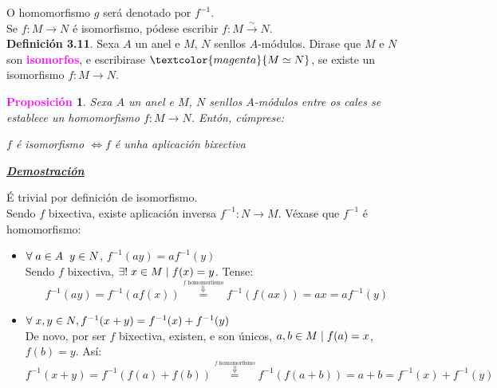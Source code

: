 \documentclass[twoside]{report}
\newcommand{\magbf}[1]{\textcolor{magenta}{\textbf{#1}}} %
\newcommand{\magen}[1]{\textcolor{magenta}{#1}}
\theoremstyle{mystyle}
\newtheorem{prop}{\magbf{Proposición}}[chapter]
\newenvironment{proposition}
{\begin{mdframed}[linecolor = magenta,backgroundcolor = classicrose, linewidth = 2mm]\begin{prop}}
{\end{prop}\end{mdframed}}
\begin{document}
\noindent O homomorfismo $g$ será denotado por $f^{-1}$.\\

\noindent Se $f: M \longrightarrow N$ é isomorfismo, pódese escribir $f: M \overset{\sim}{\longrightarrow} N$.\\

\noindent \textbf{Definición 3.11}. Sexa $A$ un anel e $M$, $N$ senllos $A$-módulos. Dirase que $M$ e $N$ son \magbf{isomorfos}, e escribirase $\magen{M \simeq N}$, se existe un isomorfismo $f: M \longrightarrow N$.\\

\begin{proposition} \label{prop3.9}
Sexa $A$ un anel e $M$, $N$ senllos $A$-módulos entre os cales se establece un homomorfismo $f: M \longrightarrow N$. Entón, cúmprese:
\begin{center}
    $f$ é isomorfismo $\Longleftrightarrow f$ é unha aplicación bixectiva  
\end{center}
\end{proposition}

\vspace{2mm}

\noindent \textbf{\textit{\underline{Demostración}}}

\vspace{2mm}

\noindent {} É trivial por definición de isomorfismo.\\

\noindent {} Sendo $f$ bixectiva, existe aplicación inversa $f^{-1}: N \longrightarrow M$. Véxase que $f^{-1}$ é homomorfismo:

\begin{itemize}
    \item $\forall \hspace{1mm} a \in A \hspace{2mm} y \in N$, $f^{-1}(ay) = af^{-1}(y)$\\
    
    Sendo $f$ bixectiva, $\exists! \hspace{1mm} x \in M \hspace{1mm} | \hspace{1mm} f(x) = y$. Tense:
    $$f^{-1}(ay) = f^{-1}(af(x)) \overset{\overset{f \text{ homomorfismo}}{\Downarrow}}{=} f^{-1}(f(ax)) = ax = af^{-1}(y)$$
    \item $\forall \hspace{1mm} x,y \in N, f^{-1}(x + y) = f^{-1}(x) + f^{-1}(y)$\\
    
    De novo, por ser $f$ bixectiva, existen, e son únicos, $a,b \in M \hspace{1mm} | \hspace{1mm} f(a) = x$, $f(b) = y$. Así:
    $$f^{-1}(x + y) = f^{-1}(f(a) + f(b)) \overset{\overset{f \text{ homomorfismo}}{\Downarrow}}{=} f^{-1}(f(a+b)) = a + b = f^{-1}(x) + f^{-1}(y)$$
\end{itemize}
\end{document}
